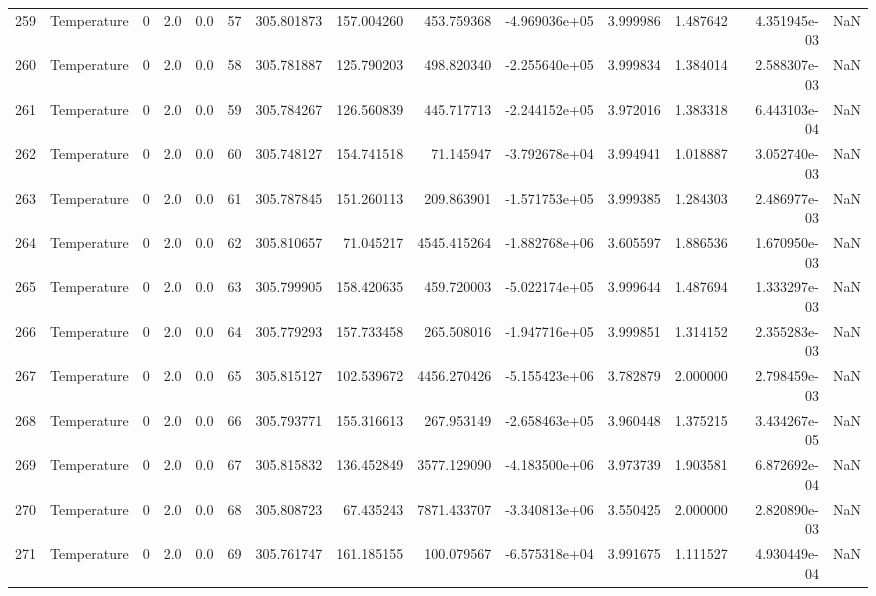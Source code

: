 \begin{tabular}{llrrrrrrrrrrrr}
259 &  Temperature &       0 &  2.0 &  0.0 &   57 &  305.801873 &   157.004260 &     453.759368 & -4.969036e+05 &  3.999986 &  1.487642 &  4.351945e-03 &      NaN \\
260 &  Temperature &       0 &  2.0 &  0.0 &   58 &  305.781887 &   125.790203 &     498.820340 & -2.255640e+05 &  3.999834 &  1.384014 &  2.588307e-03 &      NaN \\
261 &  Temperature &       0 &  2.0 &  0.0 &   59 &  305.784267 &   126.560839 &     445.717713 & -2.244152e+05 &  3.972016 &  1.383318 &  6.443103e-04 &      NaN \\
262 &  Temperature &       0 &  2.0 &  0.0 &   60 &  305.748127 &   154.741518 &      71.145947 & -3.792678e+04 &  3.994941 &  1.018887 &  3.052740e-03 &      NaN \\
263 &  Temperature &       0 &  2.0 &  0.0 &   61 &  305.787845 &   151.260113 &     209.863901 & -1.571753e+05 &  3.999385 &  1.284303 &  2.486977e-03 &      NaN \\
264 &  Temperature &       0 &  2.0 &  0.0 &   62 &  305.810657 &    71.045217 &    4545.415264 & -1.882768e+06 &  3.605597 &  1.886536 &  1.670950e-03 &      NaN \\
265 &  Temperature &       0 &  2.0 &  0.0 &   63 &  305.799905 &   158.420635 &     459.720003 & -5.022174e+05 &  3.999644 &  1.487694 &  1.333297e-03 &      NaN \\
266 &  Temperature &       0 &  2.0 &  0.0 &   64 &  305.779293 &   157.733458 &     265.508016 & -1.947716e+05 &  3.999851 &  1.314152 &  2.355283e-03 &      NaN \\
267 &  Temperature &       0 &  2.0 &  0.0 &   65 &  305.815127 &   102.539672 &    4456.270426 & -5.155423e+06 &  3.782879 &  2.000000 &  2.798459e-03 &      NaN \\
268 &  Temperature &       0 &  2.0 &  0.0 &   66 &  305.793771 &   155.316613 &     267.953149 & -2.658463e+05 &  3.960448 &  1.375215 &  3.434267e-05 &      NaN \\
269 &  Temperature &       0 &  2.0 &  0.0 &   67 &  305.815832 &   136.452849 &    3577.129090 & -4.183500e+06 &  3.973739 &  1.903581 &  6.872692e-04 &      NaN \\
270 &  Temperature &       0 &  2.0 &  0.0 &   68 &  305.808723 &    67.435243 &    7871.433707 & -3.340813e+06 &  3.550425 &  2.000000 &  2.820890e-03 &      NaN \\
271 &  Temperature &       0 &  2.0 &  0.0 &   69 &  305.761747 &   161.185155 &     100.079567 & -6.575318e+04 &  3.991675 &  1.111527 &  4.930449e-04 &      NaN \\

\end{tabular}
